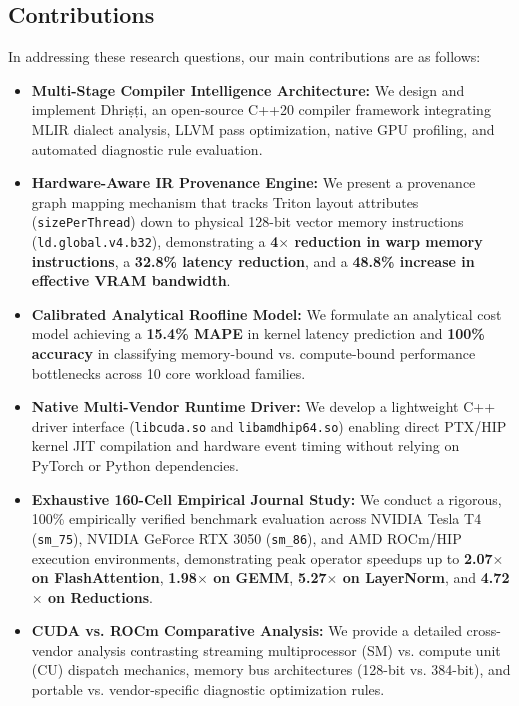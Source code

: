 \documentclass[10pt,journal,compsoc]{IEEEtran}
\begin{document}
\subsection*{Contributions}
In addressing these research questions, our main contributions are as follows:
\begin{itemize}
    \item \textbf{Multi-Stage Compiler Intelligence Architecture:} We design and implement Dhri\d{s}\d{t}i, an open-source C++20 compiler framework integrating MLIR dialect analysis, LLVM pass optimization, native GPU profiling, and automated diagnostic rule evaluation.
    \item \textbf{Hardware-Aware IR Provenance Engine:} We present a provenance graph mapping mechanism that tracks Triton layout attributes (\texttt{sizePerThread}) down to physical 128-bit vector memory instructions (\texttt{ld.global.v4.b32}), demonstrating a \textbf{4$\times$ reduction in warp memory instructions}, a \textbf{32.8\% latency reduction}, and a \textbf{48.8\% increase in effective VRAM bandwidth}.
    \item \textbf{Calibrated Analytical Roofline Model:} We formulate an analytical cost model achieving a \textbf{15.4\% MAPE} in kernel latency prediction and \textbf{100\% accuracy} in classifying memory-bound vs. compute-bound performance bottlenecks across 10 core workload families.
    \item \textbf{Native Multi-Vendor Runtime Driver:} We develop a lightweight C++ driver interface (\texttt{libcuda.so} and \texttt{libamdhip64.so}) enabling direct PTX/HIP kernel JIT compilation and hardware event timing without relying on PyTorch or Python dependencies.
    \item \textbf{Exhaustive 160-Cell Empirical Journal Study:} We conduct a rigorous, 100\% empirically verified benchmark evaluation across NVIDIA Tesla T4 (\texttt{sm\_75}), NVIDIA GeForce RTX 3050 (\texttt{sm\_86}), and AMD ROCm/HIP execution environments, demonstrating peak operator speedups up to \textbf{2.07$\times$ on FlashAttention}, \textbf{1.98$\times$ on GEMM}, \textbf{5.27$\times$ on LayerNorm}, and \textbf{4.72$\times$ on Reductions}.
    \item \textbf{CUDA vs. ROCm Comparative Analysis:} We provide a detailed cross-vendor analysis contrasting streaming multiprocessor (SM) vs. compute unit (CU) dispatch mechanics, memory bus architectures (128-bit vs. 384-bit), and portable vs. vendor-specific diagnostic optimization rules.
\end{itemize}
\end{document}
